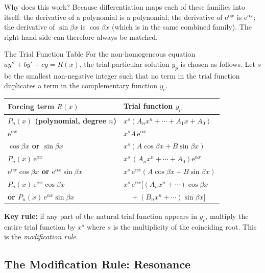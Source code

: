 \documentclass[12pt,a4paper]{article}
\newcommand{\ee}{\mathrm{e}}
\begin{document}
Why does this work? Because differentiation maps each of these families into
itself: the derivative of a polynomial is a polynomial; the derivative of
$\ee^{\alpha x}$ is $\ee^{\alpha x}$; the derivative of $\sin\beta x$ is
$\cos\beta x$ (which is in the same combined family). The right-hand side can
therefore always be matched.

\begin{procedurebox}{The Trial Function Table}
For the non-homogeneous equation $ay'' + by' + cy = R(x)$, the trial particular
solution $y_p$ is chosen as follows. Let $s$ be the smallest non-negative integer
such that no term in the trial function duplicates a term in the complementary
function $y_c$.

\vspace{6pt}
\renewcommand{\arraystretch}{1.45}
\begin{tabular}{>{\bfseries}p{5.2cm} p{5.8cm}}
\toprule
\rowcolor{midblue!14}
Forcing term $R(x)$ & Trial function $y_p$ \\
\midrule
$P_n(x)$ (polynomial, degree $n$) &
  $x^s(A_n x^n + \cdots + A_1 x + A_0)$ \\
\rowcolor{gray!8}
$\ee^{\alpha x}$ &
  $x^s A\,\ee^{\alpha x}$ \\
$\cos\beta x$ or $\sin\beta x$ &
  $x^s(A\cos\beta x + B\sin\beta x)$ \\
\rowcolor{gray!8}
$P_n(x)\,\ee^{\alpha x}$ &
  $x^s\,(A_n x^n+\cdots+A_0)\ee^{\alpha x}$ \\
$\ee^{\alpha x}\cos\beta x$ or $\ee^{\alpha x}\sin\beta x$ &
  $x^s\,\ee^{\alpha x}(A\cos\beta x + B\sin\beta x)$ \\
\rowcolor{gray!8}
$P_n(x)\,\ee^{\alpha x}\cos\beta x$ &
  $x^s\,\ee^{\alpha x}[(A_n x^n+\cdots)\cos\beta x$\\
or $P_n(x)\,\ee^{\alpha x}\sin\beta x$ &
  $\quad +(B_n x^n+\cdots)\sin\beta x]$ \\
\bottomrule
\end{tabular}
\vspace{4pt}

\textbf{Key rule:} if any part of the natural trial function appears in $y_c$,
multiply the entire trial function by $x^s$ where $s$ is the multiplicity of
the coinciding root. This is the \emph{modification rule}.
\end{procedurebox}

\subsection{The Modification Rule: Resonance}
\end{document}
